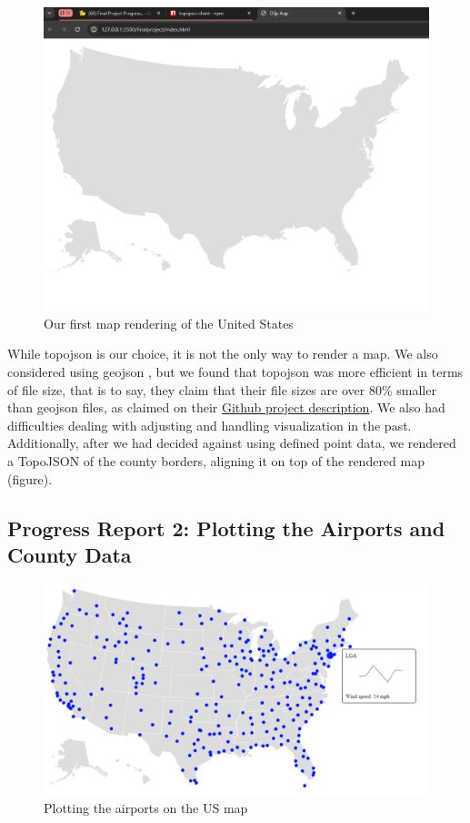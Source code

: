 \documentclass[10pt,twocolumn,twoside]{opticajnl}
\begin{document}
\begin{figure}
    \centering
    \includegraphics[scale=0.25]{images/img1.png}
    \caption{Our first map rendering of the United States}
\end{figure}

While topojson is our choice, it is not the only way to render a map. We also considered using geojson \cite{mapbox_geojsonio}, but we found that topojson was more efficient in terms of file size, that is to say, they claim that their file sizes are over 80\% smaller than geojson files, as claimed on their \href{https://github.com/topojson/topojson}{Github project description}. We also had difficulties dealing with adjusting and handling visualization in the past. Additionally, after we had decided against using defined point data, we rendered a TopoJSON of the county borders, aligning it on top of the rendered map (figure).

\subsection{Progress Report 2: Plotting the Airports and County Data}

\begin{figure}
    \centering
    \includegraphics[scale=0.25]{images/img2.png}
    \caption{Plotting the airports on the US map}
\end{figure}
\end{document}

